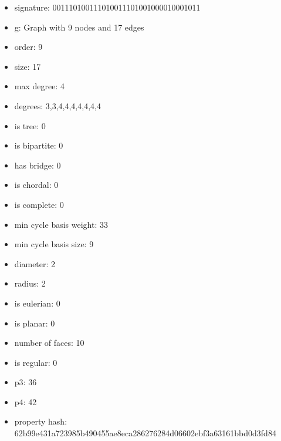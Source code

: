 \newpage
\begin{figure}
\end{figure}
\begin{itemize}
\item signature: 001110100111010011101001000010001011
\item g: Graph with 9 nodes and 17 edges
\item order: 9
\item size: 17
\item max degree: 4
\item degrees: 3,3,4,4,4,4,4,4,4
\item is tree: 0
\item is bipartite: 0
\item has bridge: 0
\item is chordal: 0
\item is complete: 0
\item min cycle basis weight: 33
\item min cycle basis size: 9
\item diameter: 2
\item radius: 2
\item is eulerian: 0
\item is planar: 0
\item number of faces: 10
\item is regular: 0
\item p3: 36
\item p4: 42
\item property hash: 62b99e431a723985b490455ae8eca286276284d06602ebf3a63161bbd0d3fd84
\end{itemize}
